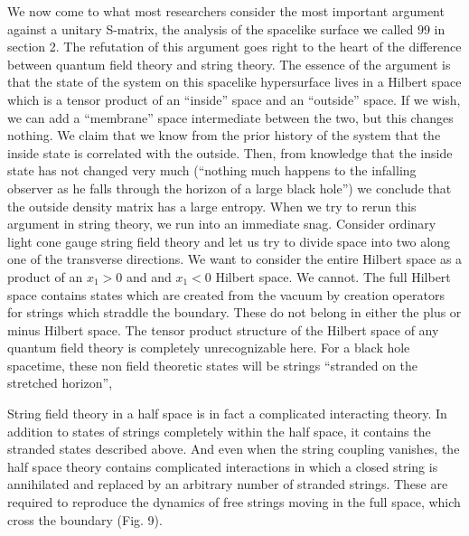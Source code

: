 We now come to what most researchers consider the most important argument
against a unitary S-matrix,
the analysis of the spacelike surface we called $99$ in section 2.
The refutation of this
argument goes right to the heart of the difference between quantum field
theory and string theory.
The essence of the argument is that the state of the system on this spacelike
hypersurface
lives in a Hilbert space which is a tensor product of an ``inside'' space and
an ``outside'' space.
If we wish, we can add a ``membrane'' space intermediate between the two, but
this changes nothing.
We claim that we know from the prior history of the system that the inside
state is correlated with
the outside.  Then, from knowledge that the inside state has not changed very
much
 (``nothing much happens to the infalling observer
as he falls through the horizon of a large black hole'') we conclude that the
outside
density matrix has a large entropy.  When we try to rerun this argument in
string theory,
we run into an immediate snag.  Consider ordinary light cone gauge string
field theory
and let us try to divide space into two along one of the transverse
directions.  We want
to consider the entire Hilbert space as a product of an $x_1 > 0$ and and
$x_1 < 0$ Hilbert space.
We cannot.  The full Hilbert space contains states which are created from the
vacuum by
creation operators for strings which straddle the boundary.  These do not
belong in either
the plus or minus Hilbert space.  The tensor product structure of the Hilbert
space of any quantum field
theory is completely unrecognizable here.  For a black hole spacetime,
these non field theoretic states will be strings ``stranded on the
stretched horizon'',

String field theory in a half space is in fact a complicated interacting
theory. In addition to states of strings completely within the half
space, it contains the stranded states described above.  And even when
the string coupling vanishes, the half space theory contains complicated
interactions in which a closed string is annihilated and replaced by an
arbitrary number of stranded strings.  These are required to reproduce
the dynamics of free strings moving in the full space, which cross
the boundary (Fig. 9).

\ifig{}
{\epsfysize=6cm }

